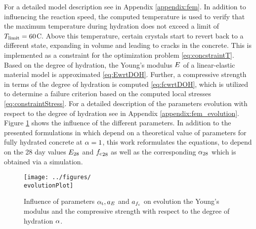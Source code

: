 For a detailed model description see in Appendix \ref{appendix:fem}.
In addition to influencing the reaction speed, the computed temperature is used to verify that the maximum temperature during hydration does not exceed a limit of $T_{\text{limit}} = 60$\textdegree C.
Above this temperature, certain crystals start to revert back to a different state, expanding in volume and leading to cracks in the concrete.
This is implemented as a constraint for the optimization problem \eqref{eq:concstraintT}.
Based on the degree of hydration, the Young's modulus $E$ of a linear-elastic material model
is approximated \eqref{eq:EwrtDOH}.
Further, a compressive strength in terms of the degree of hydration is computed \eqref{eq:fcwrtDOH}, which is utilized to determine a failure criterion based on the computed local stresses \eqref{eq:constraintStress}.
For a detailed description of the parameters evolution with respect to the degree of hydration see in Appendix \ref{appendix:fem_evolution}.
Figure \ref{fig:parameterEvolution} shows the influence of the different parameters.
In addition to the presented formulations in \cite{car_2016_mamt} which depend on a theoretical value of parameters for fully hydrated concrete at $\alpha = 1$, this work reformulates the equations, to depend on the 28 day values $E_{28}$ and ${f_{\text{c}}}_{28}$ as well as the corresponding $\alpha_{28}$ which is obtained via a simulation.

\begin{figure}[h]%
	\centering
	\texttt{[image: ../figures/\\evolutionPlot]}
	\caption{Influence of parameters $\alpha_{\text{t}}, a_{E}$ and $a_{f_{\text{c}}}$ on evolution the Young's modulus and the compressive strength with respect to the degree of hydration $\alpha$. }\label{fig:parameterEvolution}
\end{figure}